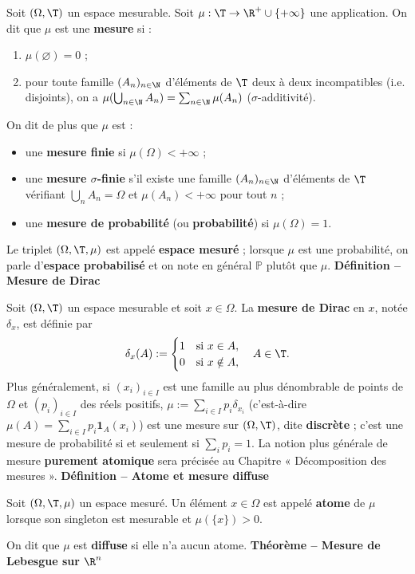 Soit $(\Omega,\T)$ un espace mesurable. Soit $\mu:\T\to\R^+\cup\{+\infty\}$ une application. On dit que $\mu$ est une \textbf{mesure} si :
\begin{enumerate}
\item $\mu(\varnothing)=0$ ;
\item pour toute famille $(A_n)_{n\in\N}$ d’éléments de $\T$ deux à deux incompatibles (i.e. disjoints), on a $\mu(\bigcup_{n\in\N}A_n)=\sum_{n\in\N}\mu(A_n)$ ($\sigma$-additivité).
\end{enumerate}
On dit de plus que $\mu$ est :
\begin{itemize}
\item une \textbf{mesure finie} si $\mu(\Omega)<+\infty$ ;
\item une \textbf{mesure $\sigma$-finie} s’il existe une famille $(A_n)_{n\in\N}$ d’éléments de $\T$ vérifiant $\bigcup_n A_n=\Omega$ et $\mu(A_n)<+\infty$ pour tout $n$ ;
\item une \textbf{mesure de probabilité} (ou \textbf{probabilité}) si $\mu(\Omega)=1$.
\end{itemize}
Le triplet $(\Omega,\T,\mu)$ est appelé \textbf{espace mesuré} ; lorsque $\mu$ est une probabilité, on parle d’\textbf{espace probabilisé} et on note en général $\mathbb P$ plutôt que $\mu$.
\textbf{Définition – Mesure de Dirac}

Soit $(\Omega,\T)$ un espace mesurable et soit $x\in\Omega$. La \textbf{mesure de Dirac} en $x$, notée $\delta_x$, est définie par
\[\delta_x(A):=\begin{cases}1&\text{si }x\in A,\\0&\text{si }x\notin A,\end{cases}\quad A\in\T.\]
Plus généralement, si $(x_i)_{i\in I}$ est une famille au plus dénombrable de points de $\Omega$ et $(p_i)_{i\in I}$ des réels positifs, $\mu:=\sum_{i\in I}p_i\delta_{x_i}$ (c’est-à-dire $\mu(A)=\sum_{i\in I}p_i\mathbf1_A(x_i)$) est une mesure sur $(\Omega,\T)$, dite \textbf{discrète} ; c’est une mesure de probabilité si et seulement si $\sum_i p_i=1$. La notion plus générale de mesure \textbf{purement atomique} sera précisée au Chapitre « Décomposition des mesures ».
\textbf{Définition – Atome et mesure diffuse}

Soit $(\Omega,\T,\mu)$ un espace mesuré. Un élément $x\in\Omega$ est appelé \textbf{atome} de $\mu$ lorsque son singleton est mesurable et $\mu(\{x\})>0$.

On dit que $\mu$ est \textbf{diffuse} si elle n’a aucun atome.
\textbf{Théorème – Mesure de Lebesgue sur $\R^n$}

